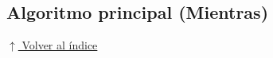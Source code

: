 \documentclass[12pt]{article}
\newcommand{\pseudocodigo}[2]{%
}
\newcommand{\volverindice}{%
    \vspace{1em}%
    \begin{flushright}%
        \hyperlink{indice}{\small $\uparrow$ Volver al índice}%
    \end{flushright}%
}
\newcommand{\enunciado}[1]{%
    \begin{quote}
        \itshape #1
    \end{quote}
}
\begin{document}
\subsection{Algoritmo principal (Mientras)}

\pseudocodigo{ej15_dias_mientras}{Conversión de días con Mientras}








\volverindice
\end{document}
